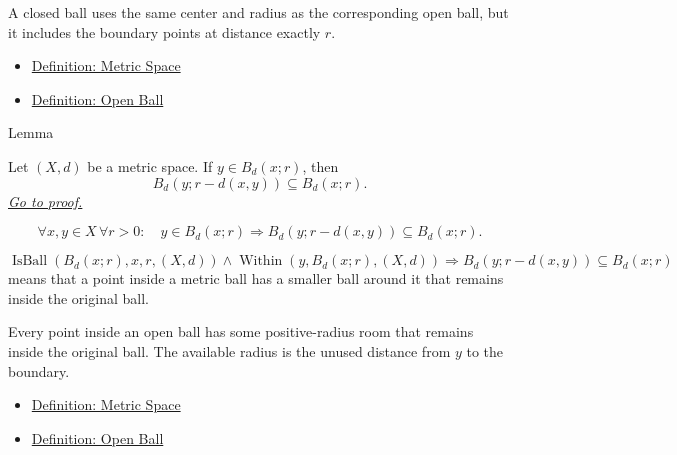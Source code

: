 \begin{remark*}[Interpretation]
A closed ball uses the same center and radius as the corresponding open ball,
but it includes the boundary points at distance exactly \(r\).
\end{remark*}

\begin{dependencies}
\begin{itemize}
  \item \hyperref[def:metric-space]{Definition: Metric Space}
  \item \hyperref[def:metric-open-ball]{Definition: Open Ball}
\end{itemize}
\end{dependencies}

\begin{lemmabox}{Lemma}
\begin{lemma}\label{lem:metric-key-local-ball}
Let \((X,d)\) be a metric space.  If \(y\in B_d(x;r)\), then
\[
  B_d(y;r-d(x,y))\subseteq B_d(x;r).
\]
\hyperref[prf:metric-key-local-ball]{\textit{Go to proof.}}
\end{lemma}
\end{lemmabox}

\begin{remark*}
\[
\forall x,y\in X\,\forall r>0{:}\quad
y\in B_d(x;r)
\Longrightarrow
B_d(y;r-d(x,y))\subseteq B_d(x;r).
\]
\end{remark*}

\begin{remark*}
\[
\operatorname{IsBall}(B_d(x;r),x,r,(X,d))
\land
\operatorname{Within}(y,B_d(x;r),(X,d))
\Longrightarrow
B_d(y;r-d(x,y))\subseteq B_d(x;r)
\]
means that a point inside a metric ball has a smaller ball around it that
remains inside the original ball.
\end{remark*}

\begin{remark*}[Interpretation]
Every point inside an open ball has some positive-radius room that remains
inside the original ball.  The available radius is the unused distance from
\(y\) to the boundary.
\end{remark*}

\begin{dependencies}
\begin{itemize}
  \item \hyperref[def:metric-space]{Definition: Metric Space}
  \item \hyperref[def:metric-open-ball]{Definition: Open Ball}
\end{itemize}
\end{dependencies}

